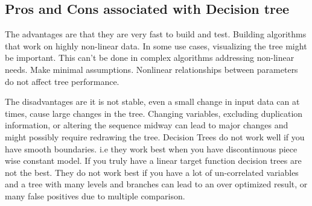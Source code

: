 \subsection{Pros and Cons associated with Decision tree} \label{Pros and Cons associated with Decision tree}

The advantages are that they are very fast to build and test. Building algorithms that work on highly non-linear data. In some use cases, visualizing the tree might be important. This can't be done in complex algorithms addressing non-linear needs.
Make minimal assumptions. Nonlinear relationships between parameters do not affect tree performance.

The disadvantages are it is not stable, even a small change in input data can at times, cause large changes in the tree. Changing variables, excluding duplication information, or altering the sequence midway can lead to major changes and might possibly require redrawing the tree. Decision Trees do not work well if you have smooth boundaries.  i.e they work best when you have discontinuous piece wise constant model. If you truly have a linear target function decision trees are not the best. They do not work best if you have a lot of un-correlated variables and a tree with many levels and branches can lead to an over optimized result, or many false positives due to multiple comparison.
